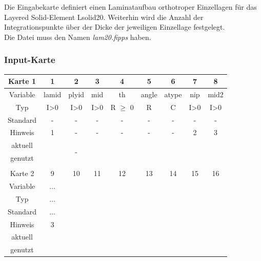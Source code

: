 \documentclass[11pt,titlepage,listof=totoc,bibliography=totoc,twoside]{scrreprt}
\begin{document}
{{Die Eingabekarte definiert einen Laminataufbau orthotroper Einzellagen für das Layered Solid-Element Lsolid20. Weiterhin wird die Anzahl der Integrationspunkte über der Dicke der jeweiligen Einzellage festgelegt.\\
Die Datei muss den Namen \emph{lam20.fipps} haben.

\subsubsection{Input-Karte}

\begin{table}[htbp]
\centering
\begin{tabularx}{\textwidth}{cCCCCCCCC}
\toprule
Karte 1         & 1     & 2      & 3       & 4              & 5              & 6      & 7    & 8                 \\
\midrule
Variable        & lamid & plyid  & mid     & th             & angle          & atype  & nip  & mid2              \\
Typ             & I>0   & I>0    & I>0     & R $\geq$ 0     & R              & C      & I>0  & I>0               \\
Standard        & -     & -      & -       & -              & -              & -      & -    & -                 \\
Hinweis         & 1     & -      & -       & -              & -              & -      & 2    & 3                 \\
aktuell         &  &  &  &  &  &   &   &  \\
genutzt \\
\\
Karte 2         & 9     & 10     & 11      & 12             & 13             & 14     & 15   & 16                \\
\midrule
Variable        & $\ldots$ &  &  &  &  &  &  &  \\
Typ             & $\ldots$ &  &  &  &  &  &  &  \\
Standard        & $\ldots$ &  &  &  &  &  &  &  \\
Hinweis         & 3        &  &  &  &  &  &  &  \\
aktuell         &  &  &  &  &  &  &  &  \\
genutzt \\
\bottomrule
\end{tabularx}
\end{table}

}}
\end{document}
